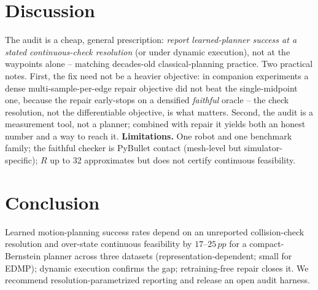 \documentclass[10pt,twocolumn]{article}
\newcommand{\pp}{\,pp}
\begin{document}
\section{Discussion}
The audit is a cheap, general prescription: \emph{report learned-planner success at a
stated continuous-check resolution} (or under dynamic execution), not at the waypoints
alone -- matching decades-old classical-planning practice. Two practical notes. First,
the fix need not be a heavier objective: in companion experiments a dense
multi-sample-per-edge repair objective did not beat the single-midpoint one, because the
repair early-stops on a densified \emph{faithful} oracle -- the check resolution, not the
differentiable objective, is what matters. Second, the audit is a measurement tool, not a
planner; combined with repair it yields both an honest number and a way to reach it.
\textbf{Limitations.} One robot and one benchmark family; the faithful checker is
PyBullet contact (mesh-level but simulator-specific); $R$ up to 32 approximates but does
not certify continuous feasibility.

\section{Conclusion}
Learned motion-planning success rates depend on an unreported collision-check resolution
and over-state continuous feasibility by $17$--$25\pp$ for a compact-Bernstein planner
across three datasets (representation-dependent; small for EDMP);
dynamic execution confirms the gap; retraining-free repair closes it. We recommend
resolution-parametrized reporting and release an open audit harness.

\small


\end{document}
